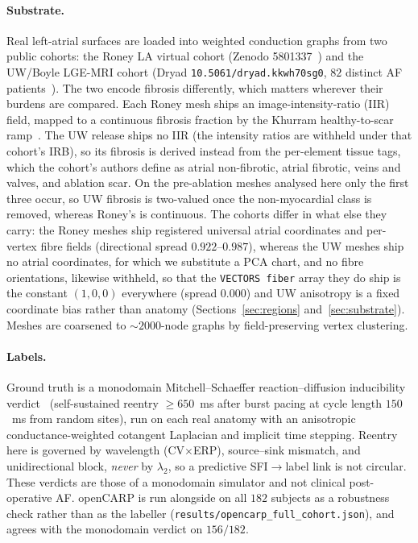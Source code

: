 \documentclass[11pt]{article}
\theoremstyle{definition}
\newcommand{\lam}{\lambda}
\newcommand{\code}[1]{\texttt{#1}}
\begin{document}
\paragraph{Substrate.} Real left-atrial surfaces are loaded into weighted
conduction graphs from two public cohorts: the Roney LA virtual cohort (Zenodo
5801337~\cite{roney2022}) and the UW/Boyle LGE-MRI cohort (Dryad
\code{10.5061/dryad.kkwh70sg0}, $82$ distinct AF patients~\cite{uwboyle2025}).
The two encode fibrosis differently, which matters wherever their burdens are
compared. Each Roney mesh ships an image-intensity-ratio (IIR) field, mapped to a
continuous fibrosis fraction by the Khurram healthy-to-scar
ramp~\cite{khurram2014}. The UW release ships no IIR (the intensity ratios are
withheld under that cohort's IRB), so its fibrosis is derived instead from the
per-element tissue tags, which the cohort's authors define as atrial
non-fibrotic, atrial fibrotic, veins and valves, and ablation scar. On the
pre-ablation meshes analysed here only the first three occur, so UW fibrosis is
two-valued once the non-myocardial class is removed, whereas Roney's is continuous.
The cohorts differ in what else they carry: the Roney meshes ship registered
universal atrial coordinates and per-vertex fibre fields (directional spread
$0.922$--$0.987$), whereas the UW meshes ship no atrial coordinates, for which we
substitute a PCA chart, and no fibre orientations, likewise withheld, so
that the \code{VECTORS fiber} array they do ship is the constant $(1,0,0)$
everywhere (spread $0.000$) and UW anisotropy is a fixed coordinate bias rather
than anatomy (Sections~\ref{sec:regions} and~\ref{sec:substrate}). Meshes
are coarsened to
$\sim\!2000$-node graphs by field-preserving vertex clustering.

\paragraph{Labels.} Ground truth is a monodomain Mitchell--Schaeffer
reaction--diffusion inducibility verdict~\cite{mitchell2003} (self-sustained
reentry $\geq 650$~ms after burst pacing at cycle length $150$~ms from random
sites), run on each real anatomy with an anisotropic conductance-weighted
cotangent Laplacian and implicit time stepping. Reentry here is governed by
wavelength (CV$\times$ERP), source--sink mismatch, and unidirectional block,
\emph{never} by $\lam_2$, so a predictive SFI$\to$label link is not circular.
These verdicts are those of a monodomain simulator and not clinical
post-operative AF. openCARP is run alongside on all $182$ subjects as a
robustness check rather than as the labeller
(\code{results/\allowbreak opencarp\_full\_cohort.json}),
and agrees with the monodomain verdict on $156/182$.
\end{document}
